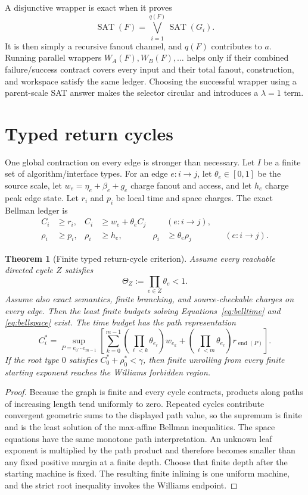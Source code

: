 \documentclass[11pt]{article}
\newtheorem{theorem}{Theorem}[section]
\newcommand{\SAT}{\operatorname{SAT}}
\begin{document}
A disjunctive wrapper is exact when it proves
\[
 \SAT(F)=\bigvee_{i=1}^{q(F)}\SAT(G_i).
\]
It is then simply a recursive fanout channel, and $q(F)$ contributes to $a$.
Running parallel wrappers $W_A(F),W_B(F),\ldots$ helps only if their combined
failure/success contract covers every input and their total fanout,
construction, and workspace satisfy the same ledger.  Choosing the successful
wrapper using a parent-scale SAT answer makes the selector circular and
introduces a $\lambda=1$ term.

\section{Typed return cycles}

One global contraction on every edge is stronger than necessary.  Let $I$ be
a finite set of algorithm/interface types.  For an edge $e:i\to j$, let
$\theta_e\in[0,1]$ be the source scale, let
$w_e=\eta_e+\beta_e+g_e$ charge fanout and access, and let $h_e$ charge peak
edge state.  Let $r_i$ and $p_i$ be local time and space charges.  The exact
Bellman ledger is
\begin{align}
 C_i&\geq r_i,& C_i&\geq w_e+\theta_eC_j &&(e:i\to j),\label{eq:belltime}\\
 \rho_i&\geq p_i,& \rho_i&\geq h_e,&
 \rho_i&\geq\theta_e\rho_j &&(e:i\to j).\label{eq:bellspace}
\end{align}

\begin{theorem}[Finite typed return-cycle criterion]
Assume every reachable directed cycle $Z$ satisfies
\[
 \Theta_Z:=\prod_{e\in Z}\theta_e<1.
\]
Assume also exact semantics, finite branching, and source-checkable charges on
every edge.  Then the least finite budgets solving
Equations~\eqref{eq:belltime} and \eqref{eq:bellspace} exist.  The time budget
has the path representation
\[
 C_i^*=\sup_{P=e_0\cdots e_{m-1}}
 \left[
 \sum_{k=0}^{m-1}\left(\prod_{\ell<k}\theta_{e_\ell}\right)w_{e_k}
 +\left(\prod_{\ell<m}\theta_{e_\ell}\right)r_{\operatorname{end}(P)}
 \right].
\]
If the root type $0$ satisfies $C_0^*+\rho_0^*<\gamma$, then finite unrolling
from every finite starting exponent reaches the Williams forbidden region.
\end{theorem}

\begin{proof}
Because the graph is finite and every cycle contracts, products along paths
of increasing length tend uniformly to zero.  Repeated cycles contribute
convergent geometric sums to the displayed path value, so the supremum is
finite and is the least solution of the max-affine Bellman inequalities.  The
space equations have the same monotone path interpretation.  An unknown leaf
exponent is multiplied by the path product and therefore becomes smaller than
any fixed positive margin at a finite depth.  Choose that finite depth after
the starting machine is fixed.  The resulting finite inlining is one uniform
machine, and the strict root inequality invokes the Williams endpoint.
\end{proof}
\end{document}
